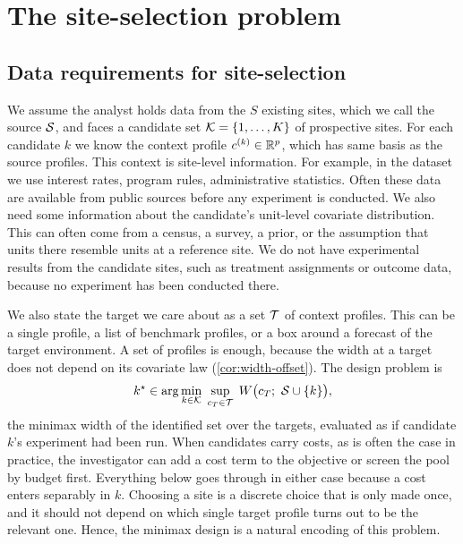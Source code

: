 \section{The site-selection problem}
\label{sec:problem}

\subsection{Data requirements for site-selection}
\label{subsec:problem-setup}

We assume the analyst holds data from the $S$ existing sites, which we call
the source $\mathcal S$, and faces a candidate set $\mathcal K=\{1,\ldots,K\}$ of
prospective sites. For each candidate $k$ we know the context profile
$c^{(k)}\in\mathbb{R}^p$, which has same basis as the source profiles. This context is
site-level information. For example, in the \citet{meager2019understanding} dataset we use interest rates, program rules, administrative
statistics. Often these data are available from public sources before any experiment is conducted.
We also need some information about the candidate's unit-level covariate
distribution. This can often come from a census, a survey, a prior, or the assumption that units
there resemble units at a reference site. We do not have experimental results from the candidate sites, such as
treatment assignments or outcome data, because no experiment has been
conducted there.

We also state the target we care about as a set $\mathcal T$ of context
profiles. This can be a single profile, a list of benchmark profiles,
or a box around a forecast of the target environment. A set of profiles
is enough, because the width at a target does not depend on its
covariate law (\cref{cor:width-offset}). The design
problem is
\begin{equation}
  k^\star \in \arg\min_{k\in\mathcal K}\;
  \sup_{c_T\in\mathcal T}\;
  W\bigl(c_T;\ \mathcal S\cup\{k\}\bigr),
  \label{eq:minimax}
\end{equation}
the minimax width of the identified set over the targets, evaluated as
if candidate $k$'s experiment had been run. When candidates carry
costs, as is often the case in practice, the investigator can add a cost term to the objective or screen
the pool by budget first. Everything below goes through in either case because a cost
enters separably in $k$. Choosing a
site is a discrete choice that is only made once, and it should not depend on which single target profile turns out to be the relevant one. Hence, the minimax design is a natural encoding of this problem.

